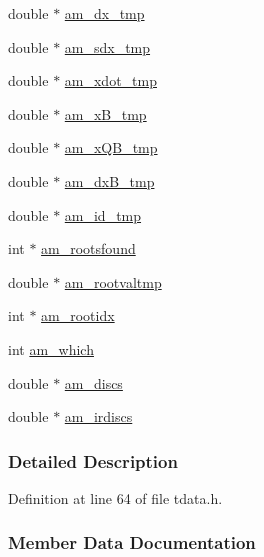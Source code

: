 \begin{DoxyCompactItemize}
\item 
double $\ast$ \hyperlink{struct_temp_data_a9bf7d112aa52d056192983f55fff2eaf}{am\+\_\+dx\+\_\+tmp}
\item 
double $\ast$ \hyperlink{struct_temp_data_a6882e67247f0ba606bea7beb58e06a2a}{am\+\_\+sdx\+\_\+tmp}
\item 
double $\ast$ \hyperlink{struct_temp_data_afb2731c31bf77c871d0900fb39e8ab16}{am\+\_\+xdot\+\_\+tmp}
\item 
double $\ast$ \hyperlink{struct_temp_data_adbc8603c1bf4ed31b70d605383186bc1}{am\+\_\+x\+B\+\_\+tmp}
\item 
double $\ast$ \hyperlink{struct_temp_data_a6dd23f804ac266653883f23ef4ac7686}{am\+\_\+x\+Q\+B\+\_\+tmp}
\item 
double $\ast$ \hyperlink{struct_temp_data_a24382a26672aa3895d846a86981f36fd}{am\+\_\+dx\+B\+\_\+tmp}
\item 
double $\ast$ \hyperlink{struct_temp_data_a3ae8375babdd7bfd0b0b05a158f36b1a}{am\+\_\+id\+\_\+tmp}
\item 
int $\ast$ \hyperlink{struct_temp_data_a7aead84117fd84087a23d968ea56b542}{am\+\_\+rootsfound}
\item 
double $\ast$ \hyperlink{struct_temp_data_aa6a5cd387c4d5257f9f8de9b04af666b}{am\+\_\+rootvaltmp}
\item 
int $\ast$ \hyperlink{struct_temp_data_a360ea220e712750c92bd3fc8b56230e2}{am\+\_\+rootidx}
\item 
int \hyperlink{struct_temp_data_a961819e25ceef7e842c469cbedccb19f}{am\+\_\+which}
\item 
double $\ast$ \hyperlink{struct_temp_data_a236419c9694ba93addaee96e347e84b9}{am\+\_\+discs}
\item 
double $\ast$ \hyperlink{struct_temp_data_acc5701e8db7a06ab4614f4008da870fe}{am\+\_\+irdiscs}
\end{DoxyCompactItemize}


\subsubsection{Detailed Description}


Definition at line 64 of file tdata.\+h.



\subsubsection{Member Data Documentation}
\hypertarget{struct_temp_data_ae0484650df254ad9cd8883e2ba028892}{}

